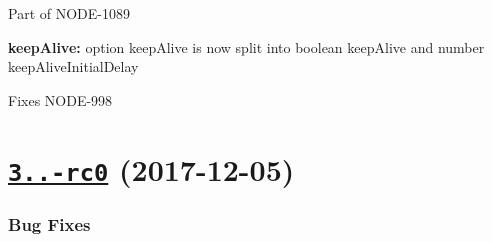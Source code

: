 Part of N\+O\+D\+E-\/1089
\begin{DoxyItemize}
\item {\bfseries keep\+Alive\+:} option {\ttfamily keep\+Alive} is now split into boolean {\ttfamily keep\+Alive} and number {\ttfamily keep\+Alive\+Initial\+Delay}
\end{DoxyItemize}

Fixes N\+O\+D\+E-\/998

\label{_3.0.0-rc0}%
 \section*{\href{https://github.com/mongodb/node-mongodb-native/compare/v2.2.31...v3.0.0-rc0}{\tt 3..-\/rc0} (2017-\/12-\/05)}

\subsubsection*{Bug Fixes}


